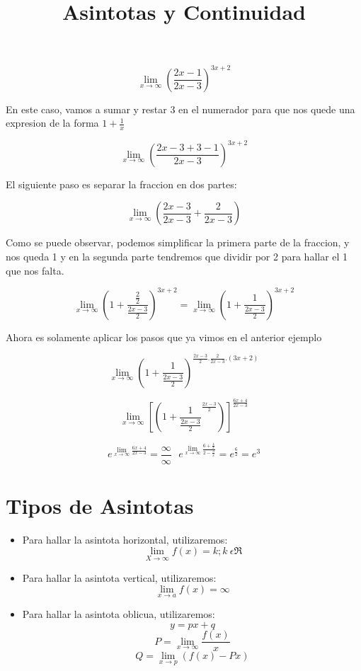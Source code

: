\documentclass{article}
\begin{document}
$$ \lim_{x \to \infty} \left(\frac{2x-1}{2x-3}\right)^{3x+2} $$

En este caso, vamos a sumar y restar 3 en el numerador para que nos quede una expresion de la forma $1 + \frac{1}{x}$ 

$$ \lim_{x \to \infty} \left(\frac{2x-3+3-1}{2x-3}\right)^{3x+2}$$

El siguiente paso es separar la fraccion en dos partes: 

$$ \lim_{x \to \infty} \left(\frac{2x-3}{2x-3} + \frac{2}{2x-3}\right)$$ 

Como se puede observar, podemos simplificar la primera parte de la fraccion, y nos queda 1 y en la segunda parte tendremos que dividir por 2 para hallar el 1 que nos falta.

$$ \lim_{ x \to \infty} \left(1+\frac{\frac{2}{2}}{\frac{2x-3}{2}}\right)^{3x+2} = \lim_{x \to \infty } \left(1+ \frac{1}{\frac{2x-3}{2}}\right)^{3x+2}$$

Ahora es solamente aplicar los pasos que ya vimos en el anterior ejemplo

$$ \lim_{x \to \infty} \left(1+ \frac{1}{\frac{2x-3}{2}}\right)^{\frac{2x-3}{2}.\frac{2}{2x-3}.(3x+2)} $$

$$ \lim_{x \to \infty} \left[\left(1+\frac{1}{\frac{2x-3}{2}}^{\frac{2x-3}{2}}\right)\right]^{\frac{6x+4}{2x-3}} $$

$$ e^{\lim_{x \to \infty} \frac{6x+4}{2x-3}} = \frac{\infty}{\infty} \ \  \ e^{\lim_{x \to \infty} \frac{6+\frac{4}{x}}{2-\frac{3}{x}}} = e^{\frac{6}{2}} = e^3$$

\newpage
\begin{center}
    \title{\LARGE\color{red}\textbf{Asintotas y Continuidad}}
\end{center}
\section{Tipos de Asintotas}
\begin{itemize}
    \item Para hallar la asintota horizontal, utilizaremos: 
     $$  \lim_{X \to \infty} f(x) = k ; k \ \epsilon \Re  $$
    \item Para hallar la asintota vertical, utilizaremos:
    $$ \lim_{x \to a} f(x) = \infty$$
    \item Para hallar la asintota oblicua, utilizaremos:
    $$ y = px + q$$ $$ P = \lim_{x \to \infty} \frac{f(x)}{x}$$ $$ Q= \lim_{x \to p}\left(f(x)- Px\right) $$
\end{itemize}
\end{document}
